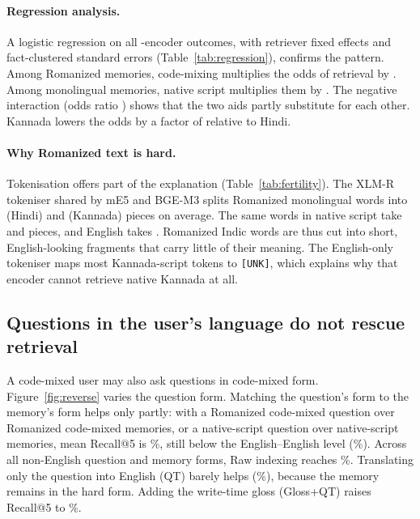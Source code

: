 \paragraph{Regression analysis.} A logistic regression on all \NumMulti{}-encoder outcomes, with retriever fixed effects and fact-clustered standard errors (Table~\ref{tab:regression}), confirms the pattern. Among Romanized memories, code-mixing multiplies the odds of retrieval by \ORMix{}. Among monolingual memories, native script multiplies them by \ORNat{}. The negative interaction (odds ratio \ORInt{}) shows that the two aids partly substitute for each other. Kannada lowers the odds by a factor of \ORKan{} relative to Hindi.

\paragraph{Why Romanized text is hard.} Tokenisation offers part of the explanation (Table~\ref{tab:fertility}). The XLM-R tokeniser shared by mE5 and BGE-M3 splits Romanized monolingual words into \FertXHiMoR{} (Hindi) and \FertXKnMoR{} (Kannada) pieces on average. The same words in native script take \FertXHiMoN{} and \FertXKnMoN{} pieces, and English takes \FertXEn{}. Romanized Indic words are thus cut into short, English-looking fragments that carry little of their meaning. The English-only tokeniser maps most Kannada-script tokens to \texttt{[UNK]}, which explains why that encoder cannot retrieve native Kannada at all.





\subsection{Questions in the user's language do not rescue retrieval}
\label{sec:reverse}
A code-mixed user may also ask questions in code-mixed form. Figure~\ref{fig:reverse} varies the question form. Matching the question's form to the memory's form helps only partly: with a Romanized code-mixed question over Romanized code-mixed memories, or a native-script question over native-script memories, mean Recall@5 is \SameFormRaw\%, still below the English--English level (\EnAvgRaw\%). Across all non-English question and memory forms, Raw indexing reaches \RevAvgRaw\%. Translating only the question into English (QT) barely helps (\RevAvgQt\%), because the memory remains in the hard form. Adding the write-time gloss (Gloss+QT) raises Recall@5 to \RevAvgGlQt\%.

